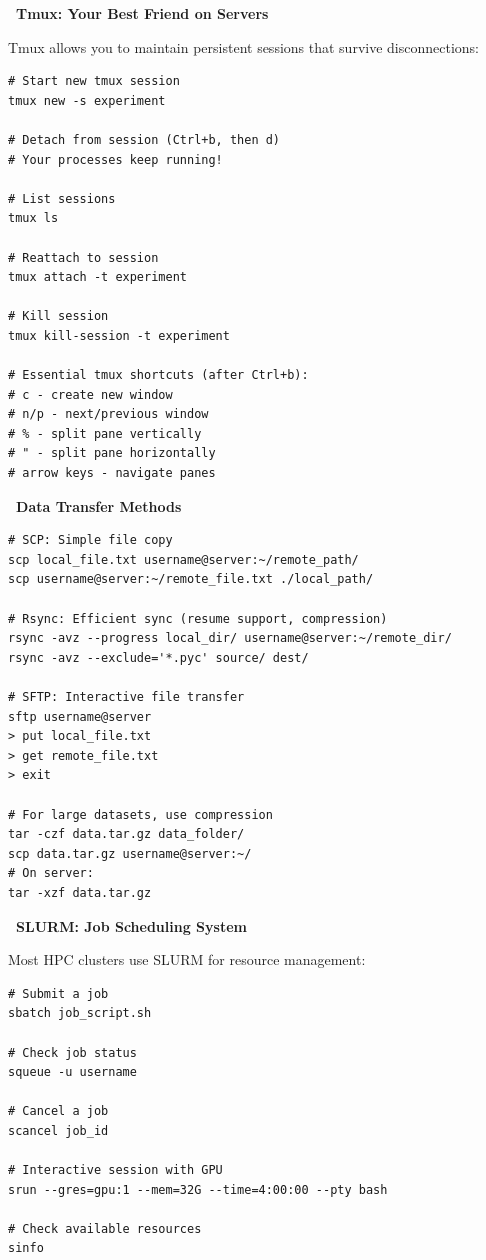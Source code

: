 \documentclass[11pt,a4paper]{article}
\begin{document}
\textbf{\faDesktop~Tmux: Your Best Friend on Servers}

Tmux allows you to maintain persistent sessions that survive disconnections:

\begin{lstlisting}[style=bashstyle]
# Start new tmux session
tmux new -s experiment

# Detach from session (Ctrl+b, then d)
# Your processes keep running!

# List sessions
tmux ls

# Reattach to session
tmux attach -t experiment

# Kill session
tmux kill-session -t experiment

# Essential tmux shortcuts (after Ctrl+b):
# c - create new window
# n/p - next/previous window
# % - split pane vertically
# " - split pane horizontally
# arrow keys - navigate panes
\end{lstlisting}

\textbf{\faSync~Data Transfer Methods}

\begin{tcolorbox}[colback=yellow!5,colframe=orange!60,title={Transferring Files to/from Servers}]
\begin{lstlisting}[style=bashstyle]
# SCP: Simple file copy
scp local_file.txt username@server:~/remote_path/
scp username@server:~/remote_file.txt ./local_path/

# Rsync: Efficient sync (resume support, compression)
rsync -avz --progress local_dir/ username@server:~/remote_dir/
rsync -avz --exclude='*.pyc' source/ dest/

# SFTP: Interactive file transfer
sftp username@server
> put local_file.txt
> get remote_file.txt
> exit

# For large datasets, use compression
tar -czf data.tar.gz data_folder/
scp data.tar.gz username@server:~/
# On server:
tar -xzf data.tar.gz
\end{lstlisting}
\end{tcolorbox}

\textbf{\faTasks~SLURM: Job Scheduling System}

Most HPC clusters use SLURM for resource management:

\begin{lstlisting}[style=bashstyle]
# Submit a job
sbatch job_script.sh

# Check job status
squeue -u username

# Cancel a job
scancel job_id

# Interactive session with GPU
srun --gres=gpu:1 --mem=32G --time=4:00:00 --pty bash

# Check available resources
sinfo
\end{lstlisting}
\end{document}
